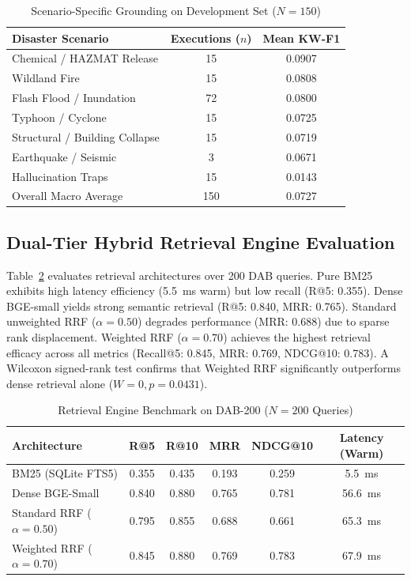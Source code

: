 \documentclass[conference]{IEEEtran}
\begin{document}
\begin{table}[!t]
\caption{Scenario-Specific Grounding on Development Set ($N=150$)}
\label{tab:scen}
\centering
\footnotesize
\setlength{\tabcolsep}{4pt}
\begin{tabular*}{\columnwidth}{@{\extracolsep{\fill}}lcc@{}}
\toprule
Disaster Scenario & Executions ($n$) & Mean KW-F1 \\
\midrule
Chemical / HAZMAT Release & 15 & 0.0907 \\
Wildland Fire & 15 & 0.0808 \\
Flash Flood / Inundation & 72 & 0.0800 \\
Typhoon / Cyclone & 15 & 0.0725 \\
Structural / Building Collapse & 15 & 0.0719 \\
Earthquake / Seismic & 3 & 0.0671 \\
Hallucination Traps & 15 & 0.0143 \\
\midrule
Overall Macro Average & 150 & 0.0727 \\
\bottomrule
\end{tabular*}
\end{table}

\subsection{Dual-Tier Hybrid Retrieval Engine Evaluation}
Table~\ref{tab:retrieval} evaluates retrieval architectures over 200 DAB queries. Pure BM25 exhibits high latency efficiency (5.5~ms warm) but low recall (R@5: 0.355). Dense BGE-small yields strong semantic retrieval (R@5: 0.840, MRR: 0.765). Standard unweighted RRF ($\alpha = 0.50$) degrades performance (MRR: 0.688) due to sparse rank displacement. Weighted RRF ($\alpha = 0.70$) achieves the highest retrieval efficacy across all metrics (Recall@5: 0.845, MRR: 0.769, NDCG@10: 0.783). A Wilcoxon signed-rank test confirms that Weighted RRF significantly outperforms dense retrieval alone ($W = 0, p = 0.0431$).

\begin{table}[!t]
\caption{Retrieval Engine Benchmark on DAB-200 ($N=200$ Queries)}
\label{tab:retrieval}
\centering
\scriptsize
\setlength{\tabcolsep}{2pt}
\begin{tabular*}{\columnwidth}{@{\extracolsep{\fill}}lccccc@{}}
\toprule
Architecture & R@5 & R@10 & MRR & NDCG@10 & Latency (Warm) \\
\midrule
BM25 (SQLite FTS5) & 0.355 & 0.435 & 0.193 & 0.259 & 5.5~ms \\
Dense BGE-Small & 0.840 & 0.880 & 0.765 & 0.781 & 56.6~ms \\
Standard RRF ($\alpha = 0.50$) & 0.795 & 0.855 & 0.688 & 0.661 & 65.3~ms \\
\midrule
Weighted RRF ($\alpha = 0.70$) & 0.845 & 0.880 & 0.769 & 0.783 & 67.9~ms \\
\bottomrule
\end{tabular*}
\end{table}
\end{document}
